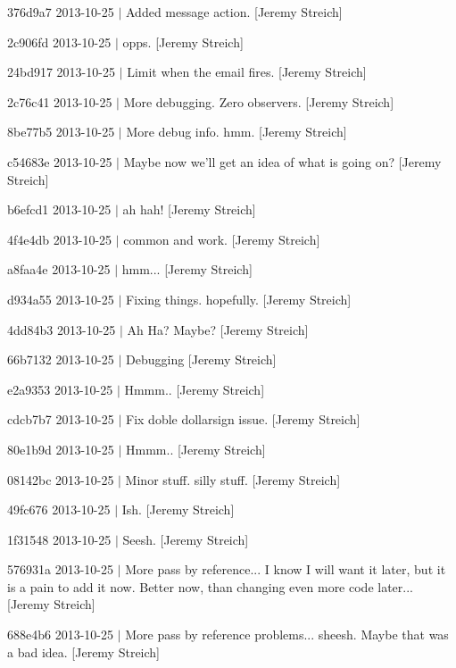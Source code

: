 \begin{DoxyItemize}
\item 376d9a7 2013-\/10-\/25 $|$ Added message action. \mbox{[}Jeremy Streich\mbox{]}
\item 2c906fd 2013-\/10-\/25 $|$ opps. \mbox{[}Jeremy Streich\mbox{]}
\item 24bd917 2013-\/10-\/25 $|$ Limit when the email fires. \mbox{[}Jeremy Streich\mbox{]}
\item 2c76c41 2013-\/10-\/25 $|$ More debugging. Zero observers. \mbox{[}Jeremy Streich\mbox{]}
\item 8be77b5 2013-\/10-\/25 $|$ More debug info. hmm. \mbox{[}Jeremy Streich\mbox{]}
\item c54683e 2013-\/10-\/25 $|$ Maybe now we'll get an idea of what is going on? \mbox{[}Jeremy Streich\mbox{]}
\item b6efcd1 2013-\/10-\/25 $|$ ah hah! \mbox{[}Jeremy Streich\mbox{]}
\item 4f4e4db 2013-\/10-\/25 $|$ common and work. \mbox{[}Jeremy Streich\mbox{]}
\item a8faa4e 2013-\/10-\/25 $|$ hmm... \mbox{[}Jeremy Streich\mbox{]}
\item d934a55 2013-\/10-\/25 $|$ Fixing things. hopefully. \mbox{[}Jeremy Streich\mbox{]}
\item 4dd84b3 2013-\/10-\/25 $|$ Ah Ha? Maybe? \mbox{[}Jeremy Streich\mbox{]}
\item 66b7132 2013-\/10-\/25 $|$ Debugging \mbox{[}Jeremy Streich\mbox{]}
\item e2a9353 2013-\/10-\/25 $|$ Hmmm.. \mbox{[}Jeremy Streich\mbox{]}
\item cdcb7b7 2013-\/10-\/25 $|$ Fix doble dollarsign issue. \mbox{[}Jeremy Streich\mbox{]}
\item 80e1b9d 2013-\/10-\/25 $|$ Hmmm.. \mbox{[}Jeremy Streich\mbox{]}
\item 08142bc 2013-\/10-\/25 $|$ Minor stuff. silly stuff. \mbox{[}Jeremy Streich\mbox{]}
\item 49fc676 2013-\/10-\/25 $|$ Ish. \mbox{[}Jeremy Streich\mbox{]}
\item 1f31548 2013-\/10-\/25 $|$ Seesh. \mbox{[}Jeremy Streich\mbox{]}
\item 576931a 2013-\/10-\/25 $|$ More pass by reference... I know I will want it later, but it is a pain to add it now. Better now, than changing even more code later... \mbox{[}Jeremy Streich\mbox{]}
\item 688e4b6 2013-\/10-\/25 $|$ More pass by reference problems... sheesh. Maybe that was a bad idea. \mbox{[}Jeremy Streich\mbox{]}

\end{DoxyItemize}
